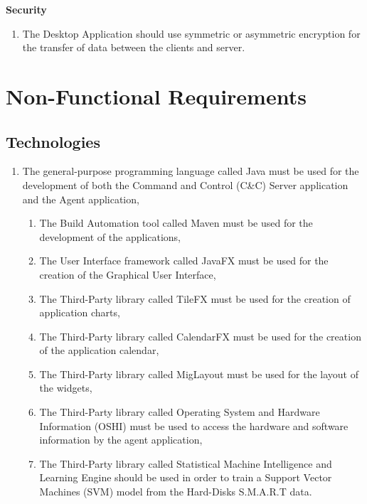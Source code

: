\noindent
\textbf{Security}

\begin{enumerate}
    \item The Desktop Application should use symmetric or asymmetric encryption for the transfer of
    data between the clients and server.
\end{enumerate}

\newpage

\section{Non-Functional Requirements}

\subsection{Technologies}

\begin{enumerate}
    \item The general-purpose programming language called Java must be used for the development of both
          the Command and Control (C\&C) Server application and the Agent application,
    \begin{enumerate}
        \item The Build Automation tool called Maven must be used for the development of the applications,
        \item The User Interface framework called JavaFX must be used for the creation of the
              Graphical User Interface,
        \item The Third-Party library called TileFX must be used for the creation of application charts,
        \item The Third-Party library called CalendarFX must be used for the creation of the
              application calendar,
        \item The Third-Party library called MigLayout must be used for the layout of the widgets,
        \item The Third-Party library called Operating System and Hardware Information (OSHI) must be used
              to access the hardware and software information by the agent application,
        \item The Third-Party library called Statistical Machine Intelligence and Learning Engine should be
              used in order to train a Support Vector Machines (SVM) model from the Hard-Disks S.M.A.R.T data.
    \end{enumerate}
\end{enumerate}

